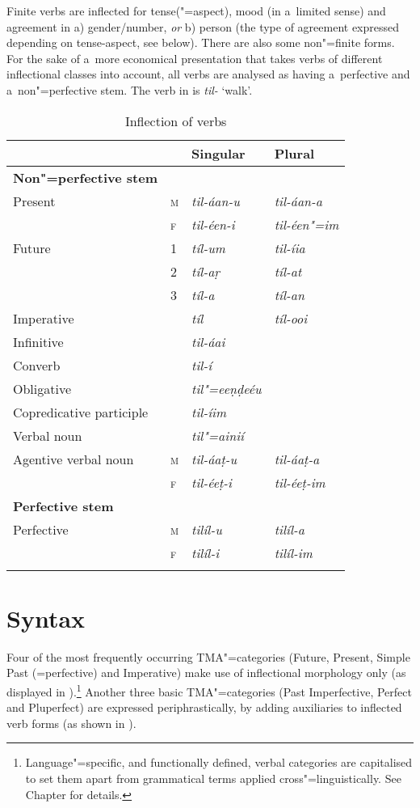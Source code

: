 Finite verbs are inflected for tense("=aspect), mood (in a~limited sense) and agreement in a)
gender/number, \textit{or} b) person (the type of agreement expressed depending on tense-aspect, see 
below). There are also some non"=finite forms. For the sake of a~more economical presentation that
takes verbs of different inflectional classes into account, all verbs are analysed as having
a~perfective and a~non"=perfective stem. The verb in  is \textit{til-} `walk'.


\begin{table}[ht]
\caption{Inflection of verbs}
\begin{tabularx}{\textwidth}{ l l Q Q }
\lsptoprule
&
&
Singular &
Plural \\\hline
\textbf{Non"=perfective stem} &
&
&
\\
Present &
\textsc{m} &
\textit{til-áan-u} &
\textit{til-áan-a} \\
&
\textsc{f} &
\textit{til-éen-i} &
\textit{til-éen"=im} \\
Future &
1 &
\textit{tíl-um} &
\textit{til-íia} \\
&
2 &
\textit{tíl-aṛ} &
\textit{tíl-at} \\
&
3 &
\textit{tíl-a} &
\textit{tíl-an} \\
Imperative &
&
\textit{tíl} &
\textit{tíl-ooi} \\
Infinitive &
&
\textit{til-áai} &
\\
Converb &
&
\textit{til-í} &
\\
Obligative &
&
\textit{til"=eeṇḍeéu} &
\\
Copredicative participle &
&
\textit{til-íim} &
\\
Verbal noun &
&
\textit{til"=ainií} &
\\
Agentive verbal noun &
\textsc{m} &
\textit{til-áaṭ-u} &
\textit{til-áaṭ-a} \\
&
\textsc{f} &
\textit{til-éeṭ-i} &
\textit{til-éeṭ-im} \\
\textbf{Perfective stem} &
&
&
\\
Perfective &
\textsc{m} &
\textit{tilíl-u} &
\textit{tilíl-a} \\
&
\textsc{f} &
\textit{tilíl-i} &
\textit{tilíl-im} \\\lspbottomrule
\end{tabularx}
\label{tab:2-verb}
\end{table}


\section{Syntax}
\label{sec:2-3}
Four of the most frequently occurring TMA"=categories (Future, Present, Simple Past (=perfective) and Imperative) make use of inflectional morphology only (as displayed in ).\footnote{Language"=specific, and functionally defined, verbal categories are capitalised to set them apart from grammatical terms applied cross"=linguistically. See Chapter  for details.} Another three basic TMA"=categories (Past Imperfective, Perfect and Pluperfect) are expressed periphrastically, by adding auxiliaries to inflected verb forms (as shown in ).


